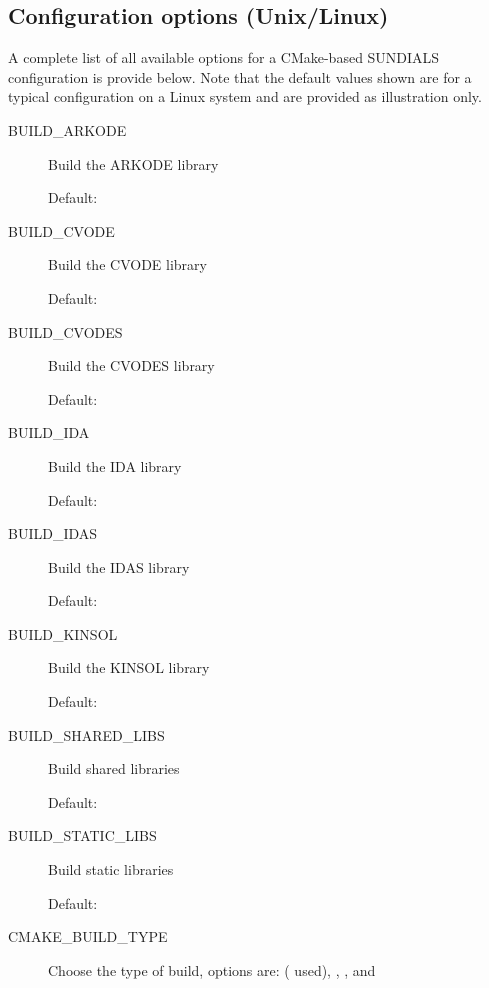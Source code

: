 \documentclass[letterpaper,10pt,english]{sphinxmanual}
\begin{document}
\subsection{Configuration options (Unix/Linux)}
\label{Install:installation-cmake-options}\label{Install:configuration-options-unix-linux}
A complete list of all available options for a CMake-based SUNDIALS
configuration is provide below.  Note that the default values shown
are for a typical configuration on a Linux system and are provided as
illustration only.
\begin{description}
\item[{BUILD\_ARKODE}] \leavevmode
Build the ARKODE library

Default: 

\item[{BUILD\_CVODE}] \leavevmode
Build the CVODE library

Default: 

\item[{BUILD\_CVODES}] \leavevmode
Build the CVODES library

Default: 

\item[{BUILD\_IDA}] \leavevmode
Build the IDA library

Default: 

\item[{BUILD\_IDAS}] \leavevmode
Build the IDAS library

Default: 

\item[{BUILD\_KINSOL}] \leavevmode
Build the KINSOL library

Default: 

\item[{BUILD\_SHARED\_LIBS}] \leavevmode
Build shared libraries

Default: 

\item[{BUILD\_STATIC\_LIBS}] \leavevmode
Build static libraries

Default: 

\item[{CMAKE\_BUILD\_TYPE}] \leavevmode
Choose the type of build, options are:
 ( used), , ,
and 


\end{description}
\end{document}

